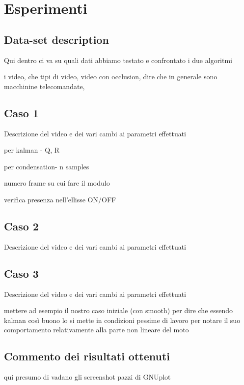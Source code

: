 
\chapter{Esperimenti}

\section{Data-set description}
Qui dentro ci va su quali dati abbiamo testato e confrontato i due algoritmi

i video, che tipi di video, video con occlusion, dire che in generale sono macchinine telecomandate, 

\section{Caso 1}
Descrizione del video e dei vari cambi ai parametri effettuati 

per kalman - Q, R

per condensation- n samples

numero frame su cui fare il modulo

verifica presenza nell'ellisse ON/OFF
\section{Caso 2}
Descrizione del video e dei vari cambi ai parametri effettuati
\section{Caso 3}
Descrizione del video e dei vari cambi ai parametri effettuati

mettere ad esempio il nostro caso iniziale (con smooth) per dire che essendo kalman così buono lo si mette in condizioni pessime di lavoro per notare il suo comportamento relativamente alla parte non lineare del moto
\section{Commento dei risultati ottenuti}
qui presumo di vadano gli screenshot pazzi di GNUplot

